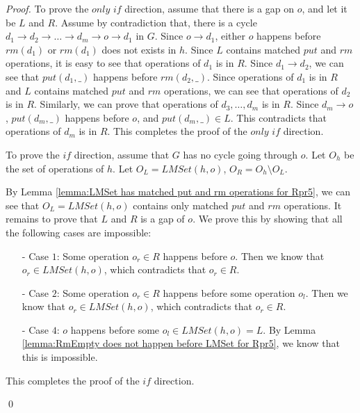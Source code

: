 \documentclass{llncs}
\begin{document}
\begin {proof}

To prove the $\textit{only if}$ direction, assume that there is a gap on $o$, and let it be $L$ and $R$. Assume by contradiction that, there is a cycle $d_1 \rightarrow d_2 \rightarrow \ldots \rightarrow d_m \rightarrow o \rightarrow d_1$ in $G$. Since $o \rightarrow d_1$, either $o$ happens before $\textit{rm}(d_1)$ or $\textit{rm}(d_1)$ does not exists in $h$. Since $L$ contains matched $\textit{put}$ and $\textit{rm}$ operations, it is easy to see that operations of $d_1$ is in $R$. Since $d_1 \rightarrow d_2$, we can see that $\textit{put}(d_1,\_)$ happens before $\textit{rm}(d_2,\_)$. Since operations of $d_1$ is in $R$ and $L$ contains matched $\textit{put}$ and $\textit{rm}$ operations, we can see that operations of $d_2$ is in $R$. Similarly, we can prove that operations of $d_3,\ldots,d_m$ is in $R$. Since $d_m \rightarrow o$, $\textit{put}(d_m,\_)$ happens before $o$, and $\textit{put}(d_m,\_) \in L$. This contradicts that operations of $d_m$ is in $R$. This completes the proof of the $\textit{only if}$ direction.

To prove the $\textit{if}$ direction, assume that $G$ has no cycle going through $o$. Let $O_h$ be the set of operations of $h$. Let $O_L = \textit{LMSet}(h,o)$, $O_R = O_h \setminus O_L$.

By Lemma \ref{lemma:LMSet has matched put and rm operations for Rpr5}, we can see that $O_L = \textit{LMSet}(h,o)$ contains only matched $\textit{put}$ and $\textit{rm}$ operations. It remains to prove that $L$ and $R$ is a gap of $o$. We prove this by showing that all the following cases are impossible:

\begin{itemize}
\setlength{\itemsep}{0.5pt}
\item[-] Case $1$: Some operation $o_r \in R$ happens before $o$. Then we know that $o_r \in \textit{LMSet}(h,o)$, which contradicts that $o_r \in R$.

\item[-] Case $2$: Some operation $o_r \in R$ happens before some operation $o_l$. Then we know that $o_r \in \textit{LMSet}(h,o)$, which contradicts that $o_r \in R$.

\item[-] Case $4$: $o$ happens before some $o_l \in \textit{LMSet}(h,o) = L$. By Lemma \ref{lemma:RmEmpty does not happen before LMSet for Rpr5}, we know that this is impossible.
\end{itemize}

This completes the proof of the $\textit{if}$ direction.

\qed
\end {proof}
\end{document}

